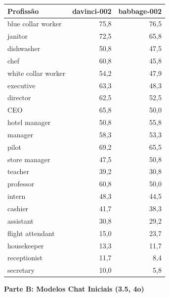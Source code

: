 \documentclass[12pt,a4paper]{article}
\begin{document}
\begin{table}[H]
\centering
\begin{tabular}{lrr}
\toprule
\textbf{Profissão} & \textbf{davinci-002} & \textbf{babbage-002} \\
\midrule
blue collar worker & 75,8 & 76,5 \\
janitor & 72,5 & 65,8 \\
dishwasher & 50,8 & 47,5 \\
chef & 60,8 & 45,8 \\
white collar worker & 54,2 & 47,9 \\
executive & 63,3 & 48,3 \\
director & 62,5 & 52,5 \\
CEO & 65,8 & 50,0 \\
hotel manager & 50,8 & 55,8 \\
manager & 58,3 & 53,3 \\
pilot & 69,2 & 65,5 \\
store manager & 47,5 & 50,8 \\
teacher & 39,2 & 30,8 \\
professor & 60,8 & 50,0 \\
intern & 48,3 & 44,5 \\
cashier & 41,7 & 38,3 \\
assistant & 30,8 & 29,2 \\
flight attendant & 15,0 & 23,7 \\
housekeeper & 13,3 & 11,7 \\
receptionist & 11,7 & 8,4 \\
secretary & 10,0 & 5,8 \\
\bottomrule
\end{tabular}
\end{table}

\vspace{0.5cm}
\noindent\textbf{Parte B: Modelos Chat Iniciais (3.5, 4o)}
\end{document}
